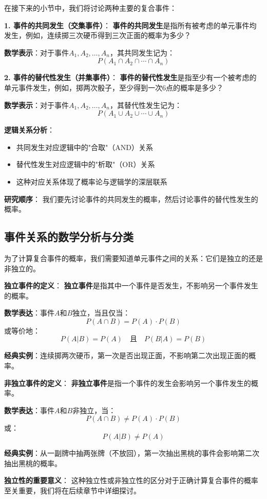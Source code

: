 \begin{theorembox}[title=复合事件的基本类型]
在接下来的小节中，我们将讨论两种主要的复合事件：

\textbf{1. 事件的共同发生（交集事件）}：
\textbf{事件的共同发生}是指所有被考虑的单元事件均发生，例如，连续掷三次硬币得到三次正面的概率为多少？

\textbf{数学表示}：对于事件$A_1, A_2, \ldots, A_n$，其共同发生记为：
$$P(A_1 \cap A_2 \cap \cdots \cap A_n)$$

\textbf{2. 事件的替代性发生（并集事件）}：
\textbf{事件的替代性发生}是指至少有一个被考虑的单元事件发生，例如，掷两次骰子，至少得到一次6点的概率是多少？

\textbf{数学表示}：对于事件$A_1, A_2, \ldots, A_n$，其替代性发生记为：
$$P(A_1 \cup A_2 \cup \cdots \cup A_n)$$

\textbf{逻辑关系分析}：
\begin{itemize}
\item 共同发生对应逻辑中的"合取"（AND）关系
\item 替代性发生对应逻辑中的"析取"（OR）关系
\item 这种对应关系体现了概率论与逻辑学的深层联系
\end{itemize}

\textbf{研究顺序}：
我们要先讨论事件的共同发生的概率，然后讨论事件的替代性发生的概率。
\end{theorembox}

\subsection{事件关系的数学分析与分类}

\begin{theorembox}[title=事件独立性的数学定义]
为了计算复合事件的概率，我们需要知道单元事件之间的关系：它们是独立的还是非独立的。

\textbf{独立事件的定义}：
\textbf{独立事件}是指其中一个事件是否发生，不影响另一个事件发生的概率。

\textbf{数学表达}：事件$A$和$B$独立，当且仅当：
$$P(A \cap B) = P(A) \cdot P(B)$$
或等价地：
$$P(A|B) = P(A) \quad \text{且} \quad P(B|A) = P(B)$$

\textbf{经典实例}：连续掷两次硬币，第一次是否出现正面，不影响第二次出现正面的概率。

\textbf{非独立事件的定义}：
\textbf{非独立事件}是指一个事件的发生会影响另一个事件发生的概率。

\textbf{数学表达}：事件$A$和$B$非独立，当：
$$P(A \cap B) \neq P(A) \cdot P(B)$$
或：
$$P(A|B) \neq P(A)$$

\textbf{经典实例}：从一副牌中抽两张牌（不放回），第一次抽出黑桃的事件会影响第二次抽出黑桃的概率。

\textbf{独立性的重要意义}：
这种独立性或非独立性的区分对于正确计算复合事件的概率至关重要，我们将在后续章节中详细探讨。
\end{theorembox}

